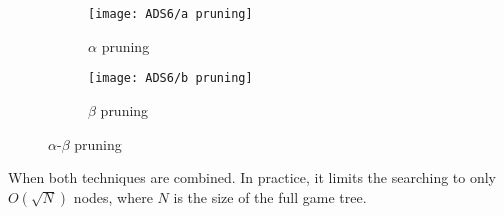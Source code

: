 \begin{figure}[!htb]
    \centering
    \begin{subfigure}{0.16\textwidth}
        \centering
        \texttt{[image: ADS6/a pruning]}
        \caption{$\alpha$ pruning}
    \end{subfigure}
    \begin{subfigure}{0.16\textwidth}
        \centering
        \texttt{[image: ADS6/b pruning]}
        \caption{$\beta$ pruning}
    \end{subfigure}
    \caption{$\alpha$-$\beta$ pruning}
\end{figure}

When both techniques are combined.  In practice, it limits the searching to only $O(\sqrt{N})$ nodes, where $N$ is the size of the full game tree.




